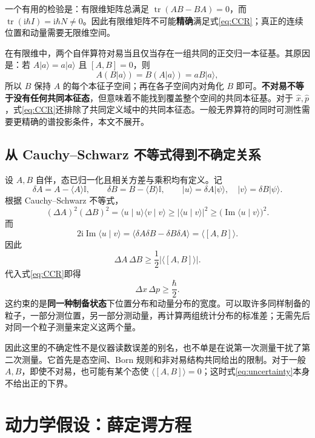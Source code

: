\documentclass[a4paper,11pt]{article}
\numberwithin{equation}{section}
\newcommand{\ii}{\mathrm{i}}
\newcommand{\I}{\mathbb I}
\newcommand{\ket}[1]{\lvert #1\rangle}
\newcommand{\braket}[2]{\langle #1\mid #2\rangle}
\newcommand{\avg}[1]{\langle #1\rangle}
\newcommand{\abs}[1]{\lvert #1\rvert}
\begin{document}
一个有用的检验是：有限维矩阵总满足 $\operatorname{tr}(AB-BA)=0$，而 $\operatorname{tr}(\ii\hbar I)=\ii\hbar N\neq0$。因此有限维矩阵不可能\textbf{精确}满足式\eqref{eq:CCR}；真正的连续位置和动量需要无限维空间。

在有限维中，两个自伴算符对易当且仅当存在一组共同的正交归一本征基。其原因是：若 $A\ket{a}=a\ket{a}$ 且 $[A,B]=0$，则
\[
  A(B\ket{a})=B(A\ket{a})=aB\ket{a},
\]
所以 $B$ 保持 $A$ 的每个本征子空间；再在各子空间内对角化 $B$ 即可。\textbf{不对易不等于没有任何共同本征态}，但意味着不能找到覆盖整个空间的共同本征基。对于 $\hat x,\hat p$，式\eqref{eq:CCR}还排除了共同定义域中的共同本征态。一般无界算符的同时可测性需要更精确的谱投影条件，本文不展开。

\subsection{从 Cauchy--Schwarz 不等式得到不确定关系}
设 $A,B$ 自伴，态已归一化且相关方差与乘积均有定义。记
\[
  \delta A=A-\avg{A}\I,\qquad
  \delta B=B-\avg{B}\I,\qquad
  \ket{u}=\delta A\ket{\psi},\quad
  \ket{v}=\delta B\ket{\psi}.
\]
根据 Cauchy--Schwarz 不等式，
\begin{equation}
  (\Delta A)^2(\Delta B)^2
  =\braket{u}{u}\braket{v}{v}
  \geq\abs{\braket{u}{v}}^2
  \geq\bigl(\operatorname{Im}\braket{u}{v}\bigr)^2.
\end{equation}
而
\[
  2\ii\operatorname{Im}\braket{u}{v}
  =\avg{\delta A\delta B-\delta B\delta A}
  =\avg{[A,B]}.
\]
因此
\begin{equation}\label{eq:uncertainty}
  \boxed{\Delta A\,\Delta B\geq\frac12\abs{\avg{[A,B]}}.}
\end{equation}
代入式\eqref{eq:CCR}即得
\begin{equation}
  \boxed{\Delta x\,\Delta p\geq\frac{\hbar}{2}.}
\end{equation}
这约束的是\textbf{同一种制备状态}下位置分布和动量分布的宽度。可以取许多同样制备的粒子，一部分测位置，另一部分测动量，再计算两组统计分布的标准差；无需先后对同一个粒子测量来定义这两个量。

因此这里的不确定性不是仪器读数误差的别名，也不单是在说第一次测量干扰了第二次测量。它首先是态空间、Born 规则和非对易结构共同给出的限制。对于一般 $A,B$，即使不对易，也可能有某个态使 $\avg{[A,B]}=0$；这时式\eqref{eq:uncertainty}本身不给出正的下界。

\section{动力学假设：薛定谔方程}
\end{document}
